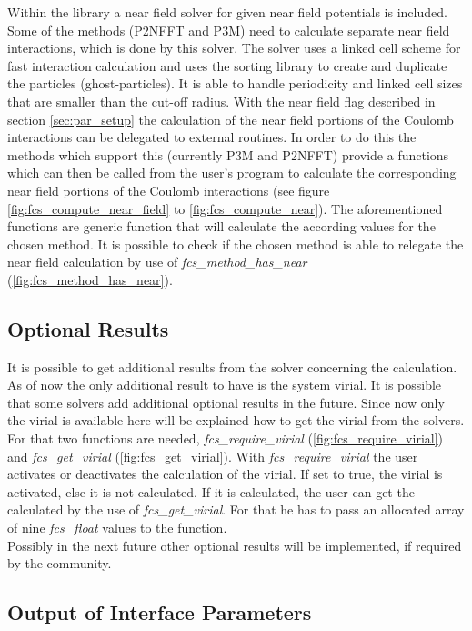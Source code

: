 Within the library a near field solver for given near field potentials is included. Some of the methods (P2NFFT and P3M) need to calculate separate near field
interactions, which is done by this solver. The solver uses a linked cell scheme for fast interaction calculation and uses the sorting library to create and
duplicate the particles (ghost-particles). It is able to handle periodicity and linked cell sizes that are smaller than the cut-off radius. With the near field
flag described in section \ref{sec:par_setup} the calculation of the near field portions of the Coulomb interactions can be delegated to external routines.
In order to do this the methods which support this (currently P3M and P2NFFT) provide a functions which can then be called from the user's program to calculate the
corresponding near field portions of the Coulomb interactions (see figure \ref{fig:fcs_compute_near_field} to \ref{fig:fcs_compute_near}). The aforementioned
functions are generic function that will calculate the according values for the chosen method. It is possible to check if the chosen method is able to relegate
the near field calculation by use of \textit{fcs\_method\_has\_near} (\ref{fig:fcs_method_has_near}).

\subsection{Optional Results}

It is possible to get additional results from the solver concerning the calculation. As of now the only additional result to have is the system virial. It is
possible that some solvers add additional optional results in the future. Since now only the virial is available here will be explained how to get the virial
from the solvers. For that two functions are needed, \textit{fcs\_require\_virial} (\ref{fig:fcs_require_virial}) and \textit{fcs\_get\_virial} (\ref{fig:fcs_get_virial}).
With \textit{fcs\_require\_virial} the user activates or deactivates the calculation of the virial. If set to true, the virial is activated, else it is not
calculated. If it is calculated, the user can get the calculated by the use of \textit{fcs\_get\_virial}. For that he has to pass an allocated array of nine
\textit{fcs\_float} values to the function.\\
Possibly in the next future other optional results will be implemented, if required by the community.

\subsection{Output of Interface Parameters}

